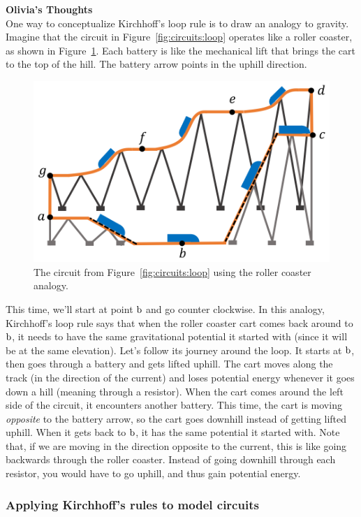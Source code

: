 \begin{framed}
\textbf{Olivia's Thoughts}\\
One way to conceptualize Kirchhoff's loop rule is to draw an analogy to gravity. Imagine that the circuit in Figure~\ref{fig:circuits:loop} operates like a roller coaster, as shown in Figure~\ref{fig:circuits:rollercoaster}. Each battery is like the mechanical lift that brings the cart to the top of the hill. The battery arrow points in the uphill direction.

\begin{figure}[!htbp]
\centering
\includegraphics[width=0.5\linewidth]{files/rollercoaster-30ac3b258fc22d96ce9b0086f3ceaa74.png}
\caption[]{The circuit from Figure~\ref{fig:circuits:loop} using the roller coaster analogy.}
\label{fig:circuits:rollercoaster}
\end{figure}

This time, we'll start at point ${\rm b}$ and go counter clockwise. In this analogy, Kirchhoff's loop rule says that when the roller coaster cart comes back around to ${\rm b}$, it needs to have the same gravitational potential it started with (since it will be at the same elevation). Let's follow its journey around the loop. It starts at ${\rm b}$, then goes through a battery and gets lifted uphill. The cart moves along the track (in the direction of the current) and loses potential energy whenever it goes down a hill (meaning through a resistor). When the cart comes around the left side of the circuit, it encounters another battery. This time, the cart is moving \textit{opposite} to the battery arrow, so the cart goes downhill instead of getting lifted uphill. When it gets back to ${\rm b}$, it has the same potential it started with. Note that, if we are moving in the direction opposite to the current, this is like going backwards through the roller coaster. Instead of going downhill through each resistor, you would have to go uphill, and thus gain potential energy.
\end{framed}

\subsubsection{Applying Kirchhoff's rules to model circuits}

